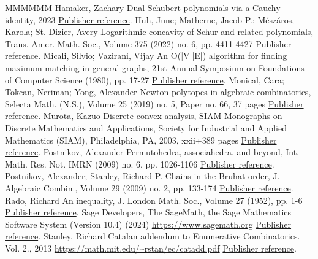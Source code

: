 \begin{thebibliography}{MMMMMM}
 Hamaker, Zachary Dual Schubert polynomials via a Cauchy identity, 2023 \href{https://alco.centre-mersenne.org/articles/10.5802/alco.450/#Hamaker}{Publisher reference}.
 Huh, June; Matherne, Jacob P.; Mészáros, Karola; St. Dizier, Avery Logarithmic concavity of Schur and related polynomials, Trans. Amer. Math. Soc., Volume 375 (2022) no. 6, pp. 4411-4427 \href{https://alco.centre-mersenne.org/articles/10.5802/alco.450/#HuhMeszaroLorSchur}{Publisher reference}.
 Micali, Silvio; Vazirani, Vijay An O(|V||E|) algorithm for finding maximum matching in general graphs, 21st Annual Symposium on Foundations of Computer Science (1980), pp. 17-27 \href{https://alco.centre-mersenne.org/articles/10.5802/alco.450/#inproceedings}{Publisher reference}.
 Monical, Cara; Tokcan, Neriman; Yong, Alexander Newton polytopes in algebraic combinatorics, Selecta Math. (N.S.), Volume 25 (2019) no. 5, Paper no. 66, 37 pages \href{https://alco.centre-mersenne.org/articles/10.5802/alco.450/#NewtonPolyinAC}{Publisher reference}.
 Murota, Kazuo Discrete convex analysis, SIAM Monographs on Discrete Mathematics and Applications, Society for Industrial and Applied Mathematics (SIAM), Philadelphia, PA, 2003, xxii+389 pages \href{https://alco.centre-mersenne.org/articles/10.5802/alco.450/#DicreteConvexAnaly}{Publisher reference}.
 Postnikov, Alexander Permutohedra, associahedra, and beyond, Int. Math. Res. Not. IMRN (2009) no. 6, pp. 1026-1106 \href{https://alco.centre-mersenne.org/articles/10.5802/alco.450/#postnikovpermutohedra}{Publisher reference}.
 Postnikov, Alexander; Stanley, Richard P. Chains in the Bruhat order, J. Algebraic Combin., Volume 29 (2009) no. 2, pp. 133-174 \href{https://alco.centre-mersenne.org/articles/10.5802/alco.450/#PostnikovStanley}{Publisher reference}.
 Rado, Richard An inequality, J. London Math. Soc., Volume 27 (1952), pp. 1-6 \href{https://alco.centre-mersenne.org/articles/10.5802/alco.450/#Rado}{Publisher reference}.
 Sage Developers, The SageMath, the Sage Mathematics Software System (Version 10.4) (2024) \url{https://www.sagemath.org} \href{https://alco.centre-mersenne.org/articles/10.5802/alco.450/#sagemath}{Publisher reference}.
 Stanley, Richard Catalan addendum to Enumerative Combinatorics. Vol. 2., 2013 \url{https://math.mit.edu/~rstan/ec/catadd.pdf} \href{https://alco.centre-mersenne.org/articles/10.5802/alco.450/#EC2add}{Publisher reference}.
\end{thebibliography}
